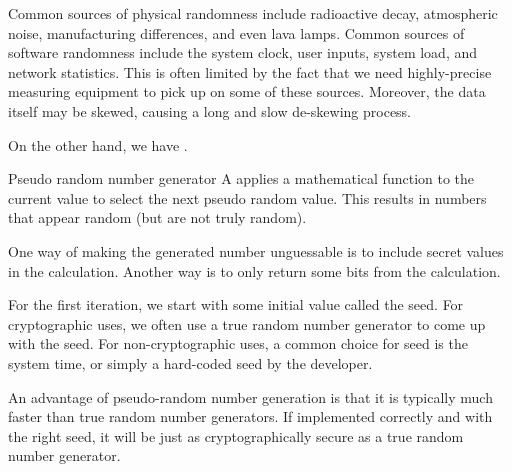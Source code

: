 Common sources of physical randomness include radioactive decay, atmospheric noise, manufacturing differences, and even lava lamps. Common sources of software randomness include the system clock, user inputs, system load, and network statistics. This is often limited by the fact that we need highly-precise measuring equipment to pick up on some of these sources. Moreover, the data itself may be skewed, causing a long and slow de-skewing process.

On the other hand, we have .

\begin{dfnbox}{Pseudo random number generator}{}
    A  applies a mathematical function to the current value to select the next pseudo random value. This results in numbers that appear random (but are not truly random).
\end{dfnbox}

One way of making the generated number unguessable is to include secret values in the calculation. Another way is to only return some bits from the calculation.

For the first iteration, we start with some initial value called the seed. For cryptographic uses, we often use a true random number generator to come up with the seed. For non-cryptographic uses, a common choice for seed is the system time, or simply a hard-coded seed by the developer.

An advantage of pseudo-random number generation is that it is typically much faster than true random number generators. If implemented correctly and with the right seed, it will be just as cryptographically secure as a true random number generator.
